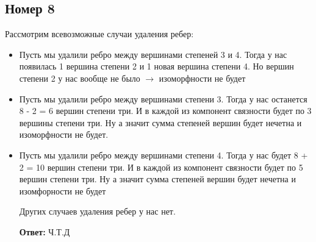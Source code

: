 \documentclass[a4paper,12pt]{article}
\begin{document}
\subsection*{Номер 8}
Рассмотрим всевозможные случаи удаления ребер:
\begin{itemize}
\item
Пусть мы удалили ребро между вершинами степеней 3 и 4. Тогда у нас появилась 1 вершина степени 2 и 1 новая вершина степени 4. Но вершин степени 2 у нас вообще не было $\rightarrow$ изоморфности не будет

\item 
Пусть мы удалили ребро между вершинами степени 3. Тогда у нас останется 8 - 2 = 6 вершин степени три. И в каждой из компонент связности будет по 3 вершины степени три. Ну а значит сумма степеней вершин будет нечетна и изоморфности не будет.
\item 
Пусть мы удалили ребро между вершинами степени 4. Тогда у нас будет 8 + 2 = 10 вершин степени три. И в каждой из компонент связности будет по 5 вершин степени три. Ну а значит сумма степеней вершин будет  нечетна и изомфорности не будет

Других случаев удаления ребер у нас нет.
\begin{center}
\textbf{Ответ:} Ч.Т.Д
\end{center}
\end{itemize}
\end{document}
